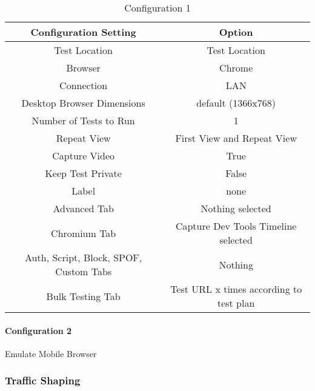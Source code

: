 \begin{table}[h]
	\caption[Test Runs]{Configuration 1}
	\label{tab:tamodelleVergleich}
	\centering
	\begin{tabular}{ |c|c| } 
	\hline
	Configuration Setting & Option \\
	\hline
	Test Location & Test Location \\ 
	Browser & Chrome \\
	\hline
	Connection & LAN \\
	Desktop Browser Dimensions & default (1366x768) \\
	Number of Tests to Run & 1 \\
	Repeat View & First View and Repeat View \\
	Capture Video & True \\
	Keep Test Private & False \\
	Label & none \\
	\hline	  
	Advanced Tab & Nothing selected \\
	Chromium Tab & Capture Dev Tools Timeline selected  \\
	Auth, Script, Block, SPOF, Custom Tabs & Nothing  \\
	Bulk Testing Tab & Test URL x times according to test plan \\
	\hline
	\end{tabular}
\end{table}

\paragraph{Configuration 2}

Emulate Mobile Browser



\subsubsection{Traffic Shaping}

